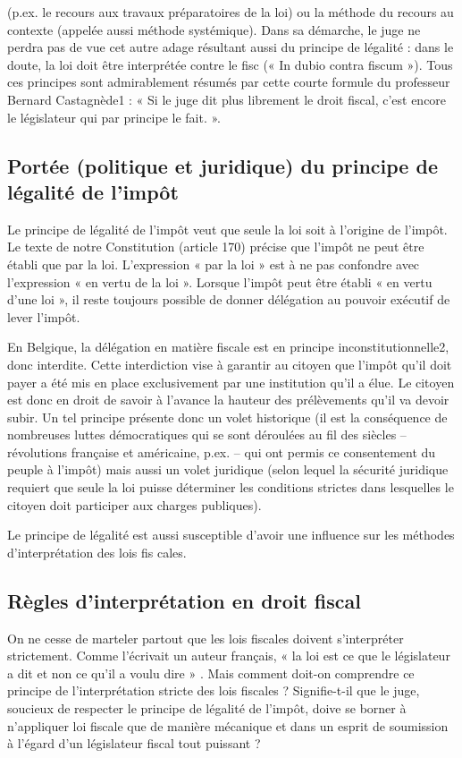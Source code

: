 \documentclass{book}
\begin{document}
(p.ex. le recours aux travaux préparatoires de la loi) ou la méthode du recours au contexte (appelée aussi méthode systémique). Dans sa démarche, le juge ne perdra pas de vue cet autre adage résultant aussi du principe de légalité : dans le doute, la loi doit être interprétée contre le ﬁsc (« In dubio contra fiscum »). Tous ces principes sont admirablement résumés par cette courte formule du professeur Bernard Castagnède1 : « Si le juge dit plus librement le droit fiscal, c’est encore le législateur qui par principe le fait. ».

\subsection*{Portée (politique et juridique) du principe de légalité de l’impôt}

Le principe de légalité de l’impôt veut que seule la loi soit à l’origine de l’impôt. Le texte de notre Constitution (article 170) précise que l’impôt ne peut être établi que par la loi. L’expression « par la loi » est à ne pas confondre avec l’expression « en vertu de la loi ». Lorsque l’impôt peut être établi « en vertu d’une loi », il reste toujours possible de donner délégation au pouvoir exécutif de lever l’impôt.

En Belgique, la délégation en matière ﬁscale est en principe inconstitutionnelle2, donc interdite. Cette interdiction vise à garantir au citoyen que l’impôt qu’il doit payer a été mis en place exclusivement par une institution qu’il a élue. Le citoyen est donc en droit de savoir à l’avance la hauteur des prélèvements qu’il va devoir subir. Un tel principe présente donc un volet historique (il est la conséquence de nombreuses luttes démocratiques qui se sont déroulées au ﬁl des siècles – révolutions française et américaine, p.ex. – qui ont permis ce consentement du peuple à l’impôt) mais aussi un volet juridique (selon lequel la sécurité juridique requiert que seule la loi puisse déterminer les conditions strictes dans lesquelles le citoyen doit participer aux charges publiques).

Le principe de légalité est aussi susceptible d’avoir une inﬂuence sur les méthodes d’interprétation des lois ﬁs
cales.

\subsection*{Règles d’interprétation en droit ﬁscal}

On ne cesse de marteler partout que les lois ﬁscales doivent s’interpréter strictement. Comme l’écrivait un auteur français, « la loi est ce que le législateur a dit et non ce qu’il a voulu dire » . Mais comment doit-on comprendre ce principe de l’interprétation stricte des lois ﬁscales ? Signiﬁe-t-il que le juge, soucieux de respecter le principe de légalité de l’impôt, doive se borner à n’appliquer loi ﬁscale que de manière mécanique et dans un esprit de soumission à l’égard d’un législateur ﬁscal tout puissant ?
\end{document}
